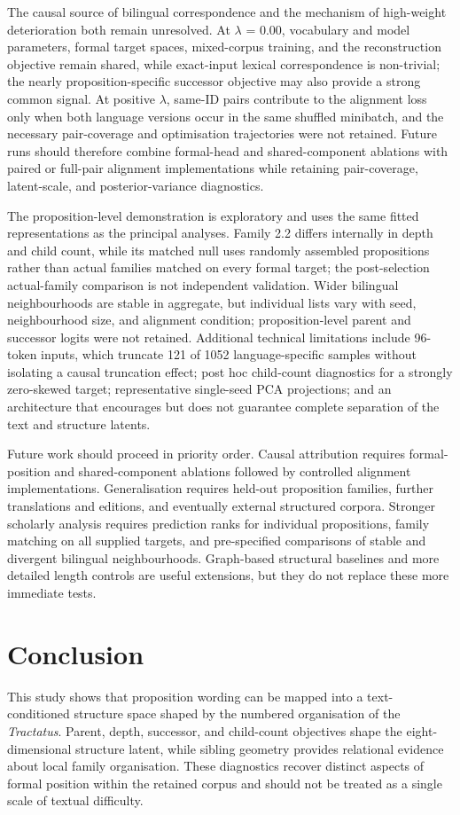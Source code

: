 \documentclass[webpdf,modern,medium,namedate]{oup-authoring-template}
\begin{document}
The causal source of bilingual correspondence and the mechanism of high-weight deterioration both remain unresolved. At $\lambda$ = 0.00, vocabulary and model parameters, formal target spaces, mixed-corpus training, and the reconstruction objective remain shared, while exact-input lexical correspondence is non-trivial; the nearly proposition-specific successor objective may also provide a strong common signal. At positive $\lambda$, same-ID pairs contribute to the alignment loss only when both language versions occur in the same shuffled minibatch, and the necessary pair-coverage and optimisation trajectories were not retained. Future runs should therefore combine formal-head and shared-component ablations with paired or full-pair alignment implementations while retaining pair-coverage, latent-scale, and posterior-variance diagnostics.

The proposition-level demonstration is exploratory and uses the same fitted representations as the principal analyses. Family 2.2 differs internally in depth and child count, while its matched null uses randomly assembled propositions rather than actual families matched on every formal target; the post-selection actual-family comparison is not independent validation. Wider bilingual neighbourhoods are stable in aggregate, but individual lists vary with seed, neighbourhood size, and alignment condition; proposition-level parent and successor logits were not retained. Additional technical limitations include 96-token inputs, which truncate 121 of 1052 language-specific samples without isolating a causal truncation effect; post hoc child-count diagnostics for a strongly zero-skewed target; representative single-seed PCA projections; and an architecture that encourages but does not guarantee complete separation of the text and structure latents.

Future work should proceed in priority order. Causal attribution requires formal-position and shared-component ablations followed by controlled alignment implementations. Generalisation requires held-out proposition families, further translations and editions, and eventually external structured corpora. Stronger scholarly analysis requires prediction ranks for individual propositions, family matching on all supplied targets, and pre-specified comparisons of stable and divergent bilingual neighbourhoods. Graph-based structural baselines and more detailed length controls are useful extensions, but they do not replace these more immediate tests.

\section{Conclusion}
This study shows that proposition wording can be mapped into a text-conditioned structure space shaped by the numbered organisation of the \emph{Tractatus}. Parent, depth, successor, and child-count objectives shape the eight-dimensional structure latent, while sibling geometry provides relational evidence about local family organisation. These diagnostics recover distinct aspects of formal position within the retained corpus and should not be treated as a single scale of textual difficulty.
\end{document}
